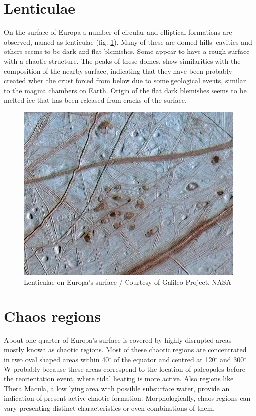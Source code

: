 \section{Lenticulae}\label{sec:lenticulae}
On the surface of Europa a number of circular and elliptical formations are observed, named as lenticulae (fig. \ref{fig:lenticulae}). Many of these are domed hills, cavities and others seems to be dark and flat blemishes. Some appear to have a rough surface with a chaotic structure. The peaks of these domes, show similarities with the composition of the nearby surface, indicating that they have been probably created when the crust forced from below due to some geological events, similar to the magma chambers on Earth. Origin of the flat dark blemishes seems to be melted ice that has been released from cracks of the surface.
\begin{figure}[h!]
    \centering
    \includegraphics[scale=0.3]{figures/Orbiter/lenticulae.jpg}
    \caption{Lenticulae on Europa's surface / Courtesy of Galileo Project, NASA}
    \label{fig:lenticulae}
\end{figure}
\section{Chaos regions}
About one quarter of Europa’s surface is covered by highly disrupted areas mostly known as chaotic regions.  Most of these chaotic regions are concentrated in two oval shaped areas within 40$^{\circ}$ of the equator and centred at 120$^{\circ}$ and 300$^{\circ}$ W probably because these areas correspond to the location of paleopoles before the reorientation event, where tidal heating is more active. Also regions like Thera Macula, a low lying area with possible subsurface water, provide an indication of present active chaotic formation. Morphologically, chaos regions can vary presenting distinct characteristics or even combinations of them.

